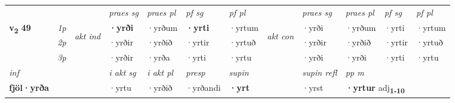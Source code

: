 \begin{longtable}[l]{X>{\footnotesize\itshape}llXXXXlXXXX}
 & &   & \textit{praes sg}  & \textit{praes pl}    & \textit{ pf sg} & \textit{pf pl} & & \textit{praes sg}  & \textit{praes pl}    & \textit{pf sg} & \textit{pf pl }  \\ \cmidrule{4-7} \cmidrule{9-12}
 \multirow{2}{*}{{{\textbf{v{\textsubscript{2}}} \Large{\textbf{49}}}}}  & 1p & \multirow{3}{*}{\begin{turn}{90}\textit{akt ind}\end{turn}} & \textbf{·yrði} & ·yrðum & \textbf{·yrti} & ·yrtum & \multirow{3}{*}{\begin{turn}{90}\textit{akt con}\end{turn}} &·yrði & ·yrðum & ·yrti & ·yrtum\\*
 & 2p &  &  ·yrðir  & ·yrðið & ·yrtir & ·yrtuð & & ·yrðir & ·yrðið & ·yrtir & ·yrtuð \\*
 & 3p &  & ·yrðir & ·yrða & ·yrti & ·yrtu & & ·yrði & ·yrði& ·yrti & ·yrtu \\*
\cmidrule{4-7} \cmidrule{9-12}

   {\textit{inf}} & &  & \textit{i akt sg} & \textit{i akt pl}   & \textit{presp} & \textit{supin} && \textit{supin refl} & \textit{pp m} \\*
  {\textbf{fjöl\allowbreak ·yrða}} & && ·yrtu  & ·yrðið   & ·yrðandi &  \textbf{·yrt} && ·yrst & \multicolumn{2}{l}{\textbf{·yrtur} adj\textbf{\textsubscript{1-10}}} \\*

\midrule


\end{longtable}
